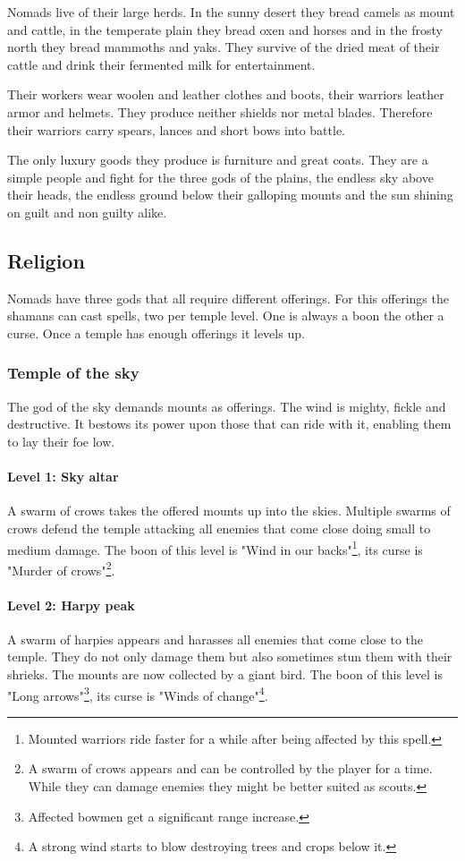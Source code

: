 \documentclass[a4paper]{article}
\begin{document}
	\Gls{Nomads} live of their large herds. In the sunny desert they bread camels as mount
	and cattle, in the temperate plain they bread oxen and horses and in the frosty north 
	they bread mammoths and yaks.
	They survive of the dried meat of their cattle and drink their fermented milk for
	entertainment.

	Their workers wear woolen and leather clothes and boots,
	their warriors leather armor and helmets.
	They produce neither shields nor metal blades.
	Therefore their warriors carry spears, lances and short bows into battle.

	The only luxury goods they produce is furniture and great coats.
	They are a simple people and fight for the three gods of the plains,
	the endless sky above their heads, the endless ground below their galloping
	mounts and the sun shining on guilt and non guilty alike.

	\subsection{Religion}
		\Gls{Nomads} have three gods that all require different offerings.
		For this offerings the shamans can cast spells, two per temple level.
		One is always a boon the other a curse.
		Once a temple has enough offerings it levels up.

		\subsubsection{Temple of the sky}
			The god of the sky demands mounts as offerings.
			The wind is mighty, fickle and destructive.
			It bestows its power upon those that can ride with it,
			enabling them to lay their foe low.

			\paragraph{Level 1: Sky altar}
				A swarm of crows takes the offered mounts up into the skies.
				Multiple swarms of crows defend the temple attacking all enemies that come
				close doing small to medium damage.
				The boon of this level is "Wind in our backs"\footnote{
					Mounted warriors ride faster for a while after being affected
					by this spell.
				},
				its curse is "Murder of crows"\footnote{
					A swarm of crows appears and can be controlled by the player for a time.
					While they can damage enemies they might be better suited as scouts.
				}.

			\paragraph{Level 2: Harpy peak}
				A swarm of harpies appears and harasses all enemies that come close to the temple.
				They do not only damage them but also sometimes stun them with their shrieks.
				The mounts are now collected by a giant bird.
				The boon of this level is "Long arrows"\footnote{
					Affected bowmen get a significant range increase.
				},
				its curse is "Winds of change"\footnote{
					A strong wind starts to blow destroying trees and crops below it.
				}.
\end{document}

